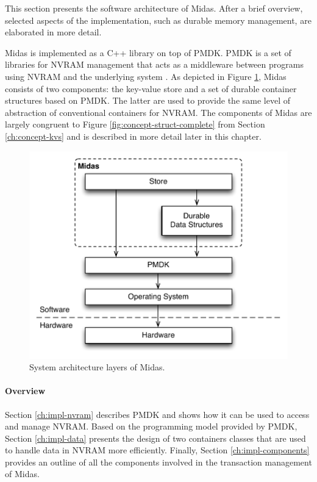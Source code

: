 This section presents the software architecture of Midas. After a brief
overview, selected aspects of the implementation, such as durable memory
management, are elaborated in more detail.

Midas is implemented as a C++ library on top of PMDK. PMDK is a set of libraries
for NVRAM management that acts as a middleware between programs using NVRAM and
the underlying system \cite{rudoff2017persistent, pmdk2018home}. As depicted in
Figure \ref{fig:impl-arch}, Midas consists of two components: the key-value
store and a set of durable container structures based on PMDK. The latter are
used to provide the same level of abstraction of conventional containers for
NVRAM. The components of Midas are largely congruent to Figure
\ref{fig:concept-struct-complete} from Section \ref{ch:concept-kvs} and is
described in more detail later in this chapter.

\begin{figure}[h!]
    \centering
    \includegraphics[scale=0.75]{figures/impl/arch2.pdf}
    \caption{System architecture layers of Midas.}
    \label{fig:impl-arch}
\end{figure}

\paragraph{Overview}

Section \ref{ch:impl-nvram} describes PMDK and shows how it can be used to
access and manage NVRAM. Based on the programming model provided by PMDK,
Section \ref{ch:impl-data} presents the design of two containers classes that
are used to handle data in NVRAM more efficiently. Finally, Section
\ref{ch:impl-components} provides an outline of all the components involved in
the transaction management of Midas.

